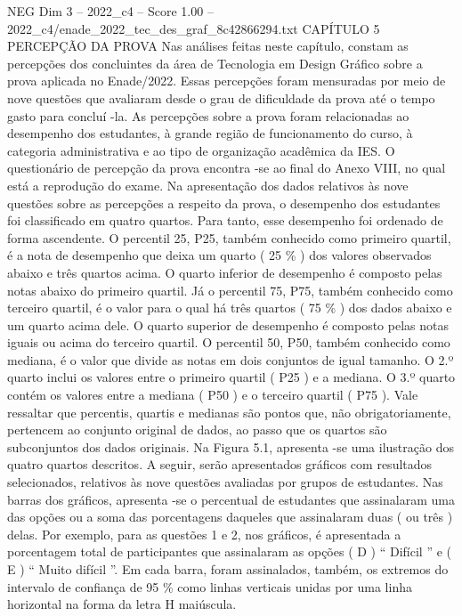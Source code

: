 \begin{textsample}{NEG Dim 3 – 2022\_c4 – Score 1.00 – 2022\_c4/enade\_2022\_tec\_des\_graf\_8c42866294.txt}  \label{ex:f3_neg_154}
CAPÍTULO 5 PERCEPÇÃO DA PROVA Nas análises feitas neste capítulo, constam as percepções dos concluintes da área de Tecnologia em Design Gráfico sobre a prova aplicada no Enade/2022.
Essas percepções foram mensuradas por meio de nove questões que avaliaram desde o grau de dificuldade da prova até o tempo gasto para concluí -la.
As percepções sobre a prova foram relacionadas ao desempenho dos estudantes, à grande região de funcionamento do curso, à categoria administrativa e ao tipo de organização acadêmica da IES.
O questionário de percepção da prova encontra -se ao final do Anexo VIII, no qual está a reprodução do exame.
Na apresentação dos dados relativos às nove questões sobre as percepções a respeito da prova, o desempenho dos estudantes foi classificado em quatro quartos.
Para tanto, esse desempenho foi ordenado de forma ascendente.
O percentil 25, P25, também conhecido como primeiro quartil, é a nota de desempenho que deixa um quarto ( 25 \% ) dos valores observados abaixo e três quartos acima.
O quarto inferior de desempenho é composto pelas notas abaixo do primeiro quartil.
Já o percentil 75, P75, também conhecido como terceiro quartil, é o valor para o qual há três quartos ( 75 \% ) dos dados abaixo e um quarto acima dele.
O quarto superior de desempenho é composto pelas notas iguais ou acima do terceiro quartil.
O percentil 50, P50, também conhecido como mediana, é o valor que divide as notas em dois conjuntos de igual tamanho.
O 2.º quarto inclui os valores entre o primeiro quartil ( P25 ) e a mediana.
O 3.º quarto contém os valores entre a mediana ( P50 ) e o terceiro quartil ( P75 ).
Vale ressaltar que percentis, quartis e medianas são pontos que, não obrigatoriamente, pertencem ao conjunto original de dados, ao passo que os quartos são subconjuntos dos dados originais.
Na Figura 5.1, apresenta -se uma ilustração dos quatro quartos descritos.
A seguir, serão apresentados gráficos com resultados selecionados, relativos às nove questões avaliadas por grupos de estudantes.
Nas barras dos gráficos, apresenta -se o percentual de estudantes que assinalaram uma das opções ou a soma das porcentagens daqueles que assinalaram duas ( ou três ) delas.
Por exemplo, para as questões 1 e 2, nos gráficos, é apresentada a porcentagem total de participantes que assinalaram as opções ( D ) “ Difícil ” e ( E ) “ Muito difícil ”.
Em cada barra, foram assinalados, também, os extremos do intervalo de confiança de 95 \% como linhas verticais unidas por uma linha horizontal na forma da letra H maiúscula.

\end{textsample}
